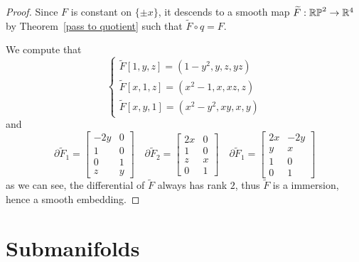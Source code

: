 \begin{proof}
Since $F$ is constant on $\{\pm x\}$, it descends to a smooth map $\widetilde{F}:\mathbb{RP}^2\to\mathbb{R}^4$ by Theorem~\ref{pass to quotient} such that $\widetilde{F}\circ q=F$.\par
We compute that
\[\left\{\begin{array}{l}
\widetilde{F}[1,y,z]=(1-y^2,y,z,yz)\\
\widetilde{F}[x,1,z]=(x^2-1,x,xz,z)\\
\widetilde{F}[x,y,1]=(x^2-y^2,xy,x,y)
\end{array}\right. \]
and
\[\partial\widetilde{F}_1=\begin{bmatrix}
-2y&0\\
1&0\\
0&1\\
z&y
\end{bmatrix}\quad\partial\widetilde{F}_2=\begin{bmatrix}
2x&0\\
1&0\\
z&x\\
0&1
\end{bmatrix}\quad\partial\widetilde{F}_1=\begin{bmatrix}
2x&-2y\\
y&x\\
1&0\\
0&1
\end{bmatrix}\]
as we can see, the differential of $\widetilde{F}$ always has rank $2$, thus $\widetilde{F}$ is a immersion, hence a smooth embedding.
\end{proof}
\chapter{Submanifolds}
